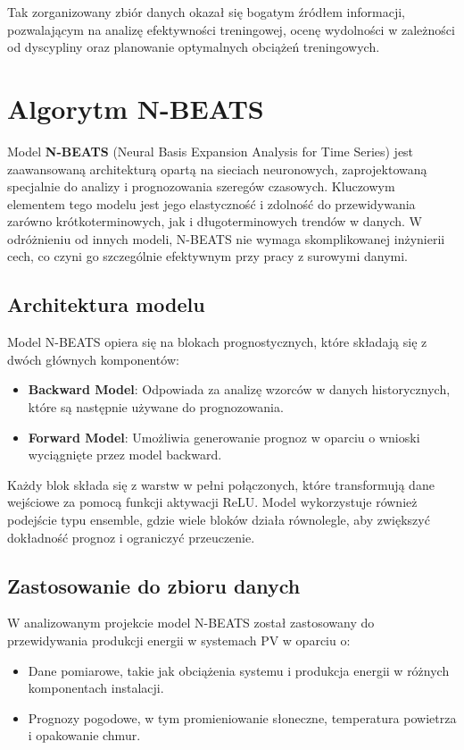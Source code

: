\documentclass[a4paper,fleqn,final]{cas-dc}\usepackage[authoryear,longnamesfirst]{natbib}
\begin{document}
Tak zorganizowany zbiór danych okazał się bogatym źródłem informacji, pozwalającym na analizę efektywności treningowej, ocenę wydolności w zależności od dyscypliny oraz planowanie optymalnych obciążeń treningowych.

\section{Algorytm N-BEATS}

Model \textbf{N-BEATS} (Neural Basis Expansion Analysis for Time Series) jest zaawansowaną architekturą opartą na sieciach neuronowych, zaprojektowaną specjalnie do analizy i prognozowania szeregów czasowych. Kluczowym elementem tego modelu jest jego elastyczność i zdolność do przewidywania zarówno krótkoterminowych, jak i długoterminowych trendów w danych. W odróżnieniu od innych modeli, N-BEATS nie wymaga skomplikowanej inżynierii cech, co czyni go szczególnie efektywnym przy pracy z surowymi danymi.

\subsection{Architektura modelu}
Model N-BEATS opiera się na blokach prognostycznych, które składają się z dwóch głównych komponentów:
\begin{itemize}
    \item \textbf{Backward Model}: Odpowiada za analizę wzorców w danych historycznych, które są następnie używane do prognozowania.
    \item \textbf{Forward Model}: Umożliwia generowanie prognoz w oparciu o wnioski wyciągnięte przez model backward.
\end{itemize}

Każdy blok składa się z warstw w pełni połączonych, które transformują dane wejściowe za pomocą funkcji aktywacji ReLU. Model wykorzystuje również podejście typu ensemble, gdzie wiele bloków działa równolegle, aby zwiększyć dokładność prognoz i ograniczyć przeuczenie.

\subsection{Zastosowanie do zbioru danych}
W analizowanym projekcie model N-BEATS został zastosowany do przewidywania produkcji energii w systemach PV w oparciu o:
\begin{itemize}
    \item Dane pomiarowe, takie jak obciążenia systemu i produkcja energii w różnych komponentach instalacji.
    \item Prognozy pogodowe, w tym promieniowanie słoneczne, temperatura powietrza i opakowanie chmur.
\end{itemize}
\end{document}
